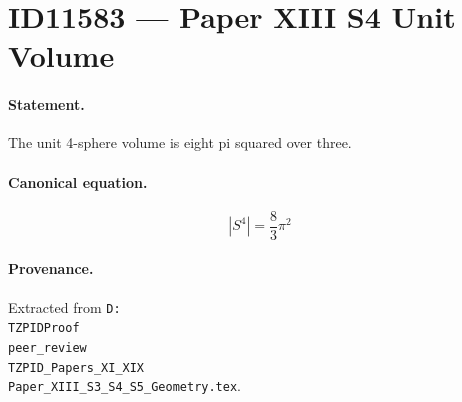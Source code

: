 \section*{ID11583 --- Paper XIII S4 Unit Volume}

\paragraph{Statement.}
The unit 4-sphere volume is eight pi squared over three.

\paragraph{Canonical equation.}
\[
|S^4|=\frac{8}{3}\pi^2
\]

\paragraph{Provenance.}
Extracted from \texttt{D:\\TZPIDProof\\peer\_review\\TZPID\_Papers\_XI\_XIX\\Paper\_XIII\_S3\_S4\_S5\_Geometry.tex}.
